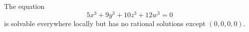 \begin{proposition}
    The equation
\[
    5x^3+9y^3+10z^3+12w^3=0
\]
    is solvable everywhere locally but has no rational solutions except $(0,0,0,0)$.
\end{proposition}
